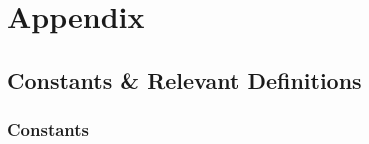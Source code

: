 \documentclass[../../Quantum-Technologies-Notes]{subfiles}
\begin{document}
	
	\ifSubfilesClassLoaded{ \pagestyle{fancy} }{}

	\section{Appendix}
		
		\subsection{Constants \& Relevant Definitions}
			
			\subsubsection{Constants}
			
			
%		
\end{document}
